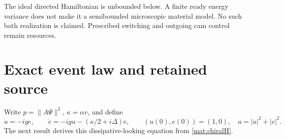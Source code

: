 \documentclass[11pt,oneside,openany]{book}
\theoremstyle{definition}
\theoremstyle{remark}\newtheorem{remark}[theorem]{Remark}
\begin{document}
The ideal directed Hamiltonian is unbounded below. A finite ready energy variance does not make it a semibounded microscopic material model. No such bath realization is claimed. Prescribed switching and outgoing cam control remain resources.

\section{Exact event law and retained source}

Write $p=\|A\Psi\|^2$, $\kappa=\alpha v$, and define
\begin{equation}
 \dot u=-ige,\qquad
 \dot e=-igu-(\kappa/2+i\Delta)e,
 \qquad (u(0),e(0))=(1,0),\quad a=|u|^2+|e|^2.
 \label{mat:reducedODE}
\end{equation}
The next result derives this dissipative-looking equation from \eqref{mat:chiralH}.
\end{document}
